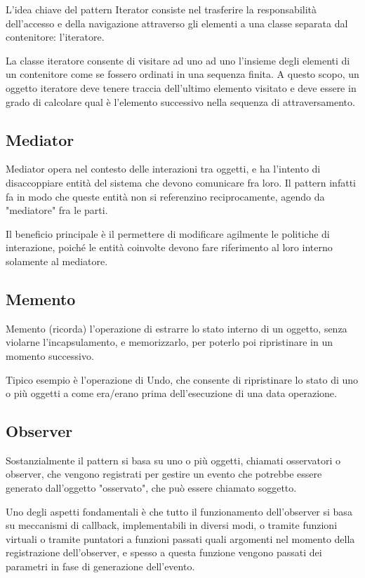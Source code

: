 L'idea chiave del pattern Iterator consiste nel trasferire la responsabilità dell'accesso e della navigazione attraverso gli elementi a una classe separata dal contenitore: l'iteratore.

La classe iteratore consente di visitare ad uno ad uno l'insieme degli elementi di un contenitore come se fossero ordinati in una sequenza finita. A questo scopo, un oggetto iteratore deve tenere traccia dell'ultimo elemento visitato e deve essere in grado di calcolare qual è l'elemento successivo nella sequenza di attraversamento.
\subsection{Mediator}
Mediator opera nel contesto delle interazioni tra oggetti, e ha l'intento di disaccoppiare entità del sistema che devono comunicare fra loro. Il pattern infatti fa in modo che queste entità non si referenzino reciprocamente, agendo da "mediatore" fra le parti.

Il beneficio principale è il permettere di modificare agilmente le politiche di interazione, poiché le entità coinvolte devono fare riferimento al loro interno solamente al mediatore.
\subsection{Memento}
Memento (ricorda) l'operazione di estrarre lo stato interno di un oggetto, senza violarne l'incapsulamento, e memorizzarlo, per poterlo poi ripristinare in un momento successivo.

Tipico esempio è l'operazione di Undo, che consente di ripristinare lo stato di uno o più oggetti a come era/erano prima dell'esecuzione di una data operazione.
\subsection{Observer}
Sostanzialmente il pattern si basa su uno o più oggetti, chiamati osservatori o observer, che vengono registrati per gestire un evento che potrebbe essere generato dall'oggetto "osservato", che può essere chiamato soggetto.

Uno degli aspetti fondamentali è che tutto il funzionamento dell'observer si basa su meccanismi di callback, implementabili in diversi modi, o tramite funzioni virtuali o tramite puntatori a funzioni passati quali argomenti nel momento della registrazione dell'observer, e spesso a questa funzione vengono passati dei parametri in fase di generazione dell'evento.
